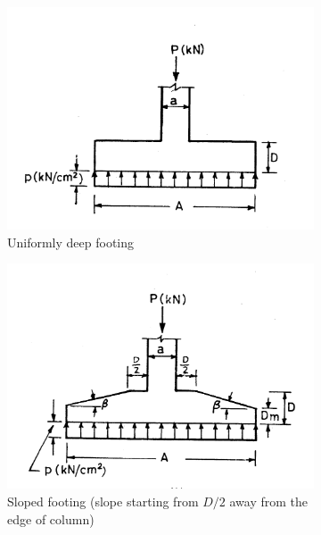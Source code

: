 \documentclass{report}
\begin{document}
\begin{figure}
\begin{subfigure}[b]{0.5\textwidth}
  \includegraphics[width=\textwidth]{images/fig2291.png}
    \caption{Uniformly deep footing}
    \label{uniformdeepfooting}
  \end{subfigure}
  \begin{subfigure}[b]{0.5\textwidth}
    \includegraphics[width=\textwidth]{images/fig2292.png}
    \caption{Sloped footing (slope starting from $D/2$ away from the edge of column)}
    \label{Slopedfooting}
  \end{subfigure}
 \begin{subfigure}[b]{0.5\textwidth}

\end{subfigure}
\end{figure}
\end{document}
